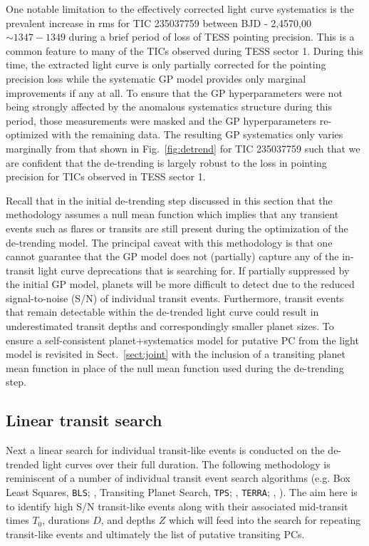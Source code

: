 One notable limitation to the effectively corrected light curve systematics is the prevalent increase
in rms for TIC 235037759 between BJD - 2,4570,00 $\sim 1347-1349$ during a brief period of loss of
TESS pointing precision.  This is a common feature to
many of the TICs observed during TESS sector 1. During this time, the extracted light curve is only
partially corrected for the pointing precision loss while the systematic GP model provides only marginal
improvements if any at all.
To ensure that the GP hyperparameters were not being strongly affected by the anomalous systematics structure
during this period, those measurements were masked and the GP hyperparameters re-optimized with the
remaining data. The resulting GP systematics only varies marginally from that shown in
Fig.~\ref{fig:detrend} for TIC 235037759 such that we are confident that the \pipeline{} de-trending is
largely robust to the loss in pointing precision for TICs observed in TESS sector 1.

Recall that in the initial de-trending step discussed in this section that the methodology
assumes a null mean function which implies that any transient events such as flares or transits are still
present during the optimization of the de-trending model.
The principal caveat with this methodology is that one cannot guarantee
that the GP model does not (partially) capture any of the in-transit light curve deprecations that
\pipeline{} is searching for. If partially suppressed by the initial GP model, planets will be more
difficult to detect due to the reduced signal-to-noise (S/N) of individual transit events.
Furthermore, transit events
that remain detectable within the de-trended light curve could result in underestimated transit depths
and correspondingly smaller planet sizes. To ensure a self-consistent planet+systematics model
for putative PC from \pipeline{,} the light model is revisited in Sect.~\ref{sect:joint}
with the inclusion of a transiting planet mean function in place of the null mean function used during
the de-trending step.

\subsection{Linear transit search} \label{sect:linearsearch}
Next a linear search for individual transit-like events is conducted on the de-trended light curves over
their full duration. The following methodology is reminiscent of a number of individual transit event
search algorithms
(e.g. Box Least Squares, \texttt{BLS}; \citealt{kovacs02}, Transiting Planet Search, \texttt{TPS};
\citealt{jenkins10,christiansen13,christiansen15,christiansen16}, \texttt{TERRA};
\citealt{petigura13a}, \citealt{foremanmackey15a}). The aim here is
to identify high S/N transit-like events along with their associated mid-transit times $T_0$,
durations $D$, and depths $Z$ which will feed into the search for repeating transit-like
events and ultimately the list of putative transiting PCs.

